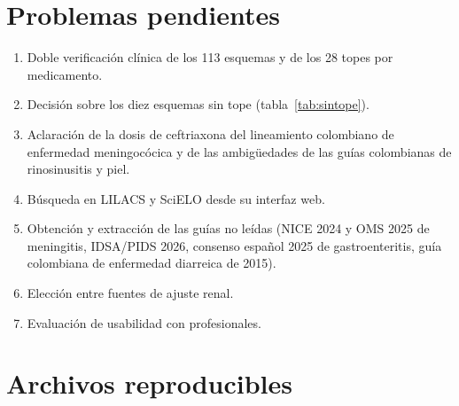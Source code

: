 \documentclass[11pt,a4paper]{article}
\begin{document}
\section{Problemas pendientes}

\begin{enumerate}
  \item Doble verificación clínica de los 113 esquemas y de los 28 topes por medicamento.
  \item Decisión sobre los diez esquemas sin tope (tabla~\ref{tab:sintope}).
  \item Aclaración de la dosis de ceftriaxona del lineamiento colombiano de enfermedad meningocócica y de las ambigüedades de las guías colombianas de rinosinusitis y piel.
  \item Búsqueda en LILACS y SciELO desde su interfaz web.
  \item Obtención y extracción de las guías no leídas (NICE 2024 y OMS 2025 de meningitis, IDSA/PIDS 2026, consenso español 2025 de gastroenteritis, guía colombiana de enfermedad diarreica de 2015).
  \item Elección entre fuentes de ajuste renal.
  \item Evaluación de usabilidad con profesionales.
\end{enumerate}

\section{Archivos reproducibles}
\end{document}
